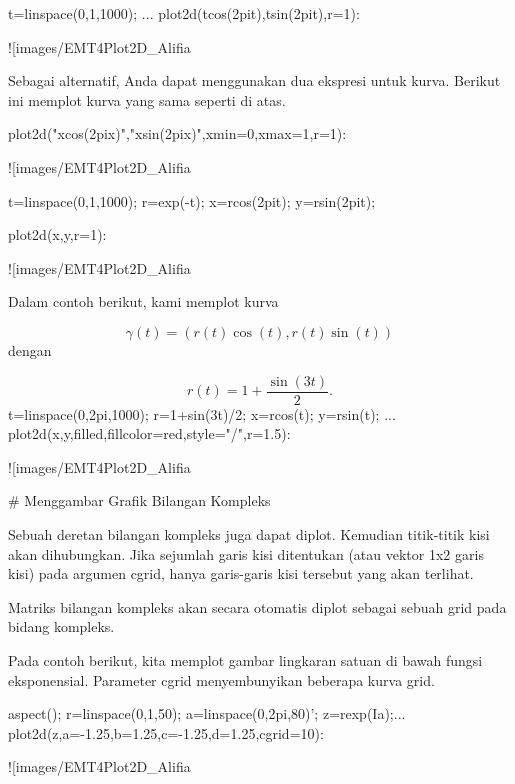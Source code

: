 \documentclass{article}
\begin{document}
\>t=linspace(0,1,1000); ...  
\>   plot2d(t\*cos(2\*pi\*t),t\*sin(2\*pi\*t),r=1):


![images/EMT4Plot2D_Alifia%

Sebagai alternatif, Anda dapat menggunakan dua ekspresi untuk kurva.
Berikut ini memplot kurva yang sama seperti di atas.


\>plot2d("x\*cos(2\*pi\*x)","x\*sin(2\*pi\*x)",xmin=0,xmax=1,r=1):


![images/EMT4Plot2D_Alifia%

\>t=linspace(0,1,1000); r=exp(-t); x=r\*cos(2pi\*t); y=r\*sin(2pi\*t);

\>plot2d(x,y,r=1):


![images/EMT4Plot2D_Alifia%

Dalam contoh berikut, kami memplot kurva


$$\gamma(t) = (r(t) \cos(t), r(t) \sin(t))$$dengan


$$r(t) = 1 + \dfrac{\sin(3t)}{2}.$$\>t=linspace(0,2pi,1000); r=1+sin(3\*t)/2; x=r\*cos(t); y=r\*sin(t); ...  
\>   plot2d(x,y,\>filled,fillcolor=red,style="/",r=1.5):


![images/EMT4Plot2D_Alifia%

# Menggambar Grafik Bilangan Kompleks

Sebuah deretan bilangan kompleks juga dapat diplot. Kemudian
titik-titik kisi akan dihubungkan. Jika sejumlah garis kisi ditentukan
(atau vektor 1x2 garis kisi) pada argumen cgrid, hanya garis-garis
kisi tersebut yang akan terlihat.


Matriks bilangan kompleks akan secara otomatis diplot sebagai sebuah
grid pada bidang kompleks.


Pada contoh berikut, kita memplot gambar lingkaran satuan di bawah
fungsi eksponensial. Parameter cgrid menyembunyikan beberapa kurva
grid.


\>aspect(); r=linspace(0,1,50); a=linspace(0,2pi,80)'; z=r\*exp(I\*a);...  
\>   plot2d(z,a=-1.25,b=1.25,c=-1.25,d=1.25,cgrid=10):


![images/EMT4Plot2D_Alifia%
\end{document}
